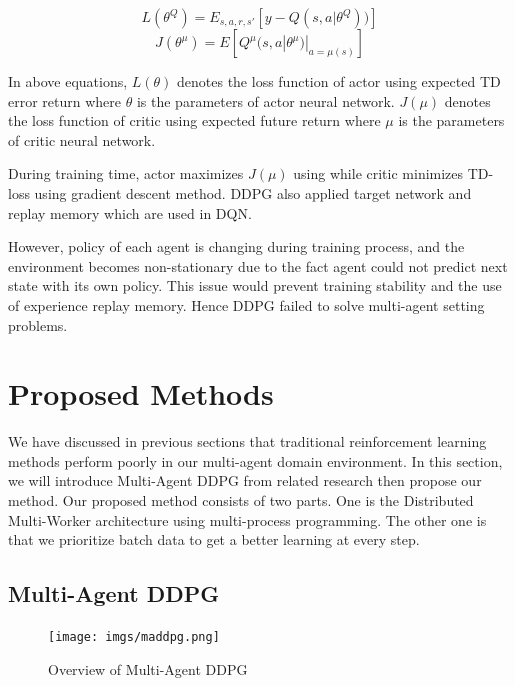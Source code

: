 \documentclass[11pt,twocolumn]{jarticle} %
\begin{document}
\begin{equation}
L(\theta^Q) = E_{s,a,r,s'}[y - Q(s, a|\theta^Q))] 
\end{equation}
\begin{equation}
J(\theta^\mu) = E[Q^\mu(s, a|\theta^\mu) | _{a=\mu(s)}]
\end{equation}

In above equations, $L(\theta)$ denotes the loss function of actor using expected TD error return where $\theta$ is the parameters of actor neural network. $J(\mu)$ denotes the loss function of critic using expected future return where $\mu$ is the parameters of critic neural network. \par

During training time, actor maximizes $J(\mu)$ using while critic minimizes TD-loss using gradient descent method. DDPG also applied target network and replay memory which are used in DQN. \par

However, policy of each agent is changing during training process, and the environment becomes non-stationary due to the fact agent could not predict next state with its own policy. This issue would prevent training stability and the use of experience replay memory. Hence DDPG failed to solve multi-agent setting problems. \par

\section{Proposed Methods}

We have discussed in previous sections that traditional reinforcement learning methods perform poorly in our multi-agent domain environment. In this section, we will introduce Multi-Agent DDPG from related research then propose our method. Our proposed method consists of two parts. One is the Distributed Multi-Worker architecture using multi-process programming. The other one is that we prioritize batch data to get a better learning at every step.

\subsection{Multi-Agent DDPG}

\begin{figure}[ht]
 \begin{center}
  \texttt{[image: imgs/maddpg.png]}
  \caption{Overview of Multi-Agent DDPG\cite{maddpg}}
  \label{fig:maddpg}
 \end{center}
\end{figure}
\end{document}

